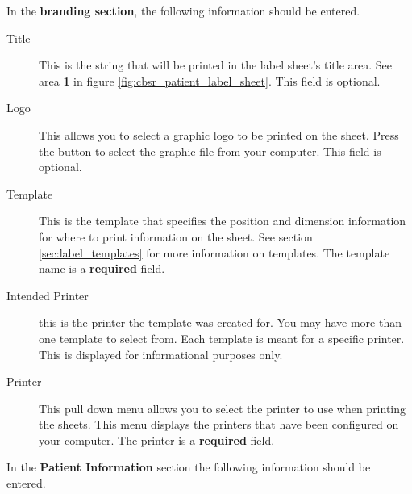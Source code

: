 In the \textbf{branding section}, the following information should be entered.

\begin{description}
\item[Title] This is the string that will be printed in the label sheet's title
  area. See area \textbf{1} in figure \ref{fig:cbsr_patient_label_sheet}. This field
  is optional.
\item[Logo] This allows you to select a graphic logo to be printed on the
  sheet. Press the  button to select the graphic file from your
  computer. This field is optional.
\item[Template] This is the template that specifies the position and dimension
  information for where to print information on the sheet. See section
  \ref{sec:label_templates} for more information on templates. The template
  name is a \textbf{required} field.
\item[Intended Printer] this is the printer the template was created for. You
  may have more than one template to select from. Each template is meant for a
  specific printer. This is displayed for informational purposes only.
\item[Printer] This pull down menu allows you to select the printer to use when
  printing the sheets. This menu displays the printers that have been
  configured on your computer. The printer is a \textbf{required} field.
\end{description}

In the \textbf{Patient Information} section the following information should be
entered.

